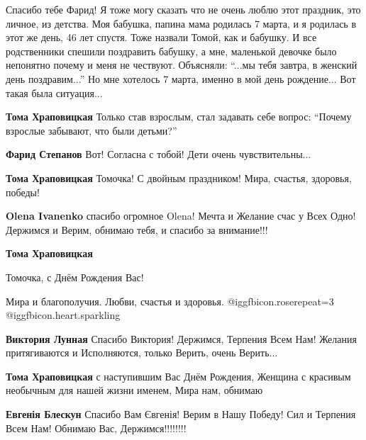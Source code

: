  
 
 
 
 
\zzSecCmt

\begin{itemize} %

Спасибо тебе Фарид! Я тоже могу сказать что не очень люблю этот праздник, это
личное, из детства. Моя бабушка, папина мама родилась 7 марта, и я родилась в
этот же день, 46 лет спустя. Тоже назвали Томой, как и бабушку. И все
родственники спешили поздравить бабушку, а мне, маленькой девочке было
непонятно почему и меня не чествуют. Объясняли: \enquote{...мы тебя завтра, в женский
день поздравим...} Но мне хотелось 7 марта, именно в мой день рождение... Вот
такая была ситуация...

\begin{itemize} %
\textbf{Тома Храповицкая}
Только став взрослым, стал задавать себе вопрос: \enquote{Почему взрослые забывают, что были детьми?}

\textbf{Фарид Степанов} Вот! Согласна с тобой! Дети очень чувствительны...

\textbf{Тома Храповицкая} Томочка! С двойным праздником! Мира, счастья, здоровья, победы!

\textbf{Olena Ivanenko} спасибо огромное Olena! Мечта и Желание счас у Всех Одно! Держимся и Верим, обнимаю тебя, и спасибо за внимание!!!

\textbf{Тома Храповицкая} 

Томочка, с Днём Рождения Вас!

Мира и благополучия. Любви, счастья и здоровья. @igg{fbicon.rose}{repeat=3}
@igg{fbicon.heart.sparkling} 

\textbf{Виктория Лунная} Спасибо Виктория! Держимся, Терпения Всем Нам! Желания притягиваются и Исполняются, только Верить, очень Верить...

\textbf{Тома Храповицкая} с наступившим Вас Днём Рождения, Женщина с красивым необычным для нашей жизни именем, Мира нам, обнимаю

\textbf{Евгенія Блескун} Спасибо Вам Євгенія! Верим в Нашу Победу! Сил и Терпения Всем Нам! Обнимаю Вас, Держимся!!!!!!!!


\end{itemize}
\end{itemize}
